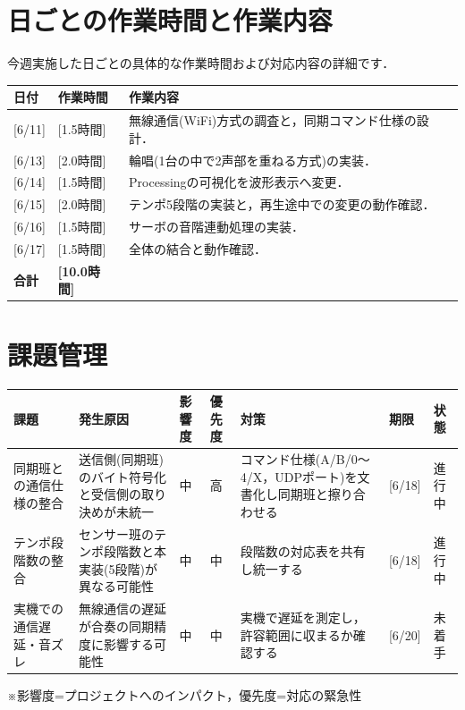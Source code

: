 \documentclass[uplatex,dvipdfmx]{jlreq}
\begin{document}
\section{日ごとの作業時間と作業内容}
今週実施した日ごとの具体的な作業時間および対応内容の詳細です．
\begin{table}[H]
    \centering
    \small
    \begin{tabular}{lll}
        \toprule
        日付 & 作業時間 & 作業内容 \\
        \midrule
        {}[6/11] & [1.5時間] & 無線通信(WiFi)方式の調査と，同期コマンド仕様の設計． \\
        {}[6/13] & [2.0時間] & 輪唱(1台の中で2声部を重ねる方式)の実装． \\
        {}[6/14] & [1.5時間] & Processingの可視化を波形表示へ変更． \\
        {}[6/15] & [2.0時間] & テンポ5段階の実装と，再生途中での変更の動作確認． \\
        {}[6/16] & [1.5時間] & サーボの音階連動処理の実装． \\
        {}[6/17] & [1.5時間] & 全体の結合と動作確認． \\
        \midrule
        \textbf{合計} & \textbf{[10.0時間]} & \\
        \bottomrule
    \end{tabular}
\end{table}

\section{課題管理}
\begin{table}[H]
    \centering
    \small
    \begin{tabular}{p{3cm}p{3cm}llp{3cm}ll}
        \toprule
        課題 & 発生原因 & 影響度 & 優先度 & 対策 & 期限 & 状態 \\
        \midrule
        同期班との通信仕様の整合 & 送信側(同期班)のバイト符号化と受信側の取り決めが未統一 & 中 & 高 & コマンド仕様(A/B/0〜4/X，UDPポート)を文書化し同期班と擦り合わせる & [6/18] & 進行中 \\
        テンポ段階数の整合 & センサー班のテンポ段階数と本実装(5段階)が異なる可能性 & 中 & 中 & 段階数の対応表を共有し統一する & [6/18] & 進行中 \\
        実機での通信遅延・音ズレ & 無線通信の遅延が合奏の同期精度に影響する可能性 & 中 & 中 & 実機で遅延を測定し，許容範囲に収まるか確認する & [6/20] & 未着手 \\
        \bottomrule
    \end{tabular}
\end{table}
\vspace{0.5em}
\noindent ※影響度=プロジェクトへのインパクト，優先度=対応の緊急性
\end{document}
